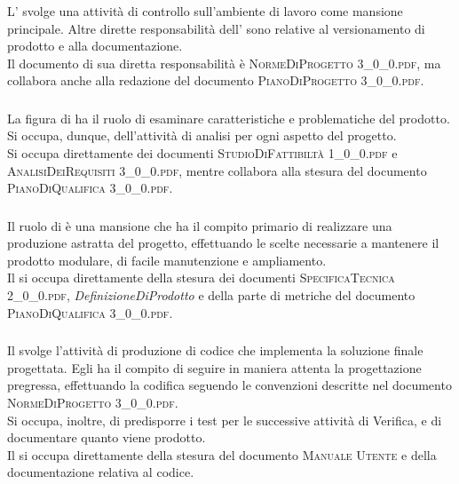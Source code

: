 		\subsubsection{\Amm}
		L'\textit{\Amm} svolge una attività di controllo sull'ambiente di lavoro come mansione principale. Altre dirette responsabilità dell'\textit{\Amm} sono relative al versionamento di prodotto e alla documentazione.\\
		Il documento di sua diretta responsabilità è \textsc{NormeDiProgetto 3\_0\_0.pdf}, ma collabora anche alla redazione del documento \textsc{PianoDiProgetto 3\_0\_0.pdf}.
		
		\subsubsection{\Ana}
		La figura di \textit{\Ana} ha il ruolo di esaminare caratteristiche e problematiche del prodotto. Si occupa, dunque, dell'attività di analisi per ogni aspetto del progetto.\\
		Si occupa direttamente dei documenti \textsc{StudioDiFattibiltà 1\_0\_0.pdf} e \textsc{AnalisiDeiRequisiti 3\_0\_0.pdf}, mentre collabora alla stesura del documento \textsc{PianoDiQualifica 3\_0\_0.pdf}.

		\subsubsection{\Prog}
		Il ruolo di \textit{\Prog} è una mansione che ha il compito primario di realizzare una produzione astratta del progetto, effettuando le scelte necessarie a mantenere il prodotto modulare, di facile manutenzione e ampliamento.\\
		Il \textit{\Prog} si occupa direttamente della stesura dei documenti \textsc{SpecificaTecnica 2\_0\_0.pdf}, \textit{DefinizioneDiProdotto} e della parte di metriche del documento \textsc{PianoDiQualifica 3\_0\_0.pdf}.
		
		\subsubsection{\Progr}
		Il \textit{\Progr} svolge l'attività di produzione di codice che implementa la soluzione finale progettata. Egli ha il compito di seguire in maniera attenta la progettazione pregressa, effettuando la codifica seguendo le convenzioni descritte nel documento \textsc{NormeDiProgetto 3\_0\_0.pdf}.\\
		Si occupa, inoltre, di predisporre i test per le successive attività di Verifica, e di documentare quanto viene prodotto.\\
		Il \textit{\Progr} si occupa direttamente della stesura del documento \textsc{Manuale Utente} e della documentazione relativa al codice.
		
